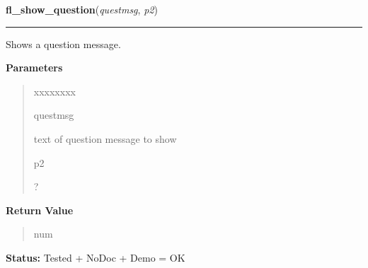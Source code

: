     \label{xformslib:flgoodies:fl_show_question}

    \vspace{0.5ex}

\hspace{.8\funcindent}\begin{boxedminipage}{\funcwidth}

    \raggedright \textbf{fl\_show\_question}(\textit{questmsg}, \textit{p2})

    \vspace{-1.5ex}

    \rule{\textwidth}{0.5\fboxrule}
\setlength{\parskip}{2ex}
    Shows a question message.

\setlength{\parskip}{1ex}
      \textbf{Parameters}
      \vspace{-1ex}

      \begin{quote}
        \begin{Ventry}{xxxxxxxx}

          \item[questmsg]

          text of question message to show

          \item[p2]

          ?

        \end{Ventry}

      \end{quote}

      \textbf{Return Value}
    \vspace{-1ex}

      \begin{quote}
      num

      \end{quote}

\textbf{Status:} Tested + NoDoc + Demo = OK



    \end{boxedminipage}

    \label{xformslib:flgoodies:fl_hide_question}

    \vspace{0.5ex}

